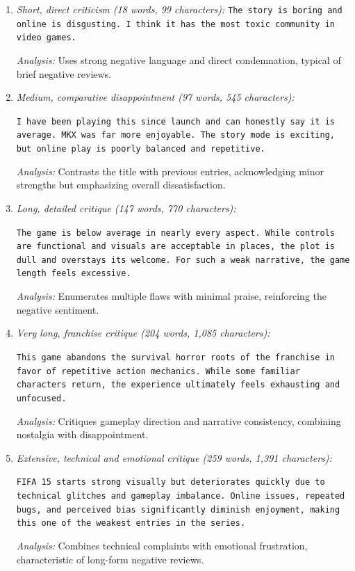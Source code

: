 \begin{enumerate}
    \item \textit{Short, direct criticism (18 words, 99 characters):}  
    \texttt{The story is boring and online is disgusting. I think it has the most toxic community in video games.}

    \textit{Analysis:} Uses strong negative language and direct condemnation, typical of brief negative reviews.

    \item \textit{Medium, comparative disappointment (97 words, 545 characters):}

    \texttt{I have been playing this since launch and can honestly say it is average. MKX was far more enjoyable. The story mode is exciting, but online play is poorly balanced and repetitive.}

    \textit{Analysis:} Contrasts the title with previous entries, acknowledging minor strengths but emphasizing overall dissatisfaction.

    \item \textit{Long, detailed critique (147 words, 770 characters):}

    \texttt{The game is below average in nearly every aspect. While controls are functional and visuals are acceptable in places, the plot is dull and overstays its welcome. For such a weak narrative, the game length feels excessive.}

    \textit{Analysis:} Enumerates multiple flaws with minimal praise, reinforcing the negative sentiment.

    \item \textit{Very long, franchise critique (204 words, 1{,}085 characters):}

    \texttt{This game abandons the survival horror roots of the franchise in favor of repetitive action mechanics. While some familiar characters return, the experience ultimately feels exhausting and unfocused.}

    \textit{Analysis:} Critiques gameplay direction and narrative consistency, combining nostalgia with disappointment.

    \item \textit{Extensive, technical and emotional critique (259 words, 1{,}391 characters):}

    \texttt{FIFA 15 starts strong visually but deteriorates quickly due to technical glitches and gameplay imbalance. Online issues, repeated bugs, and perceived bias significantly diminish enjoyment, making this one of the weakest entries in the series.}

    \textit{Analysis:} Combines technical complaints with emotional frustration, characteristic of long-form negative reviews.
\end{enumerate}

